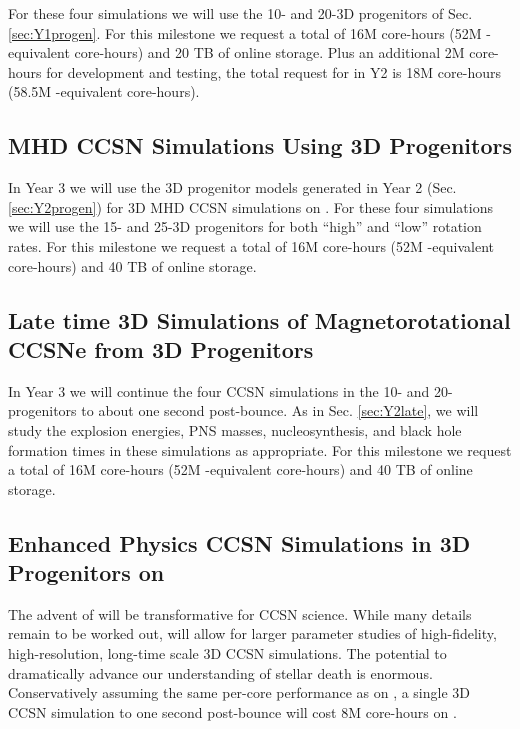 For these four simulations we will use the 10- and 20-\msun 3D progenitors of Sec. \ref{sec:Y1progen}.
For this milestone we request a total of 16M \thet core-hours (52M \mira-equivalent core-hours) and 20 TB of online storage.
Plus an additional 2M \thet core-hours for development and testing, the total request for \thet in Y2 is 18M core-hours (58.5M \mira-equivalent core-hours).

\vspace{0.1in} 

\subsection{MHD CCSN Simulations Using 3D Progenitors}

In Year 3 we will use the 3D progenitor models generated in Year 2 (Sec. \ref{sec:Y2progen}) for 3D MHD CCSN simulations on \thet.
For these four simulations we will use the 15- and 25-\msun 3D progenitors for both ``high'' and ``low'' rotation rates.
For this milestone we request a total of 16M \thet core-hours (52M \mira-equivalent core-hours) and 40 TB of online storage.

\subsection{Late time 3D Simulations of Magnetorotational CCSNe from 3D Progenitors}

In Year 3 we will continue the four CCSN simulations in the 10- and 20-\msun progenitors to about one second post-bounce.
As in Sec. \ref{sec:Y2late}, we will study the explosion energies, PNS masses, nucleosynthesis, and black hole formation times in these simulations as appropriate.
For this milestone we request a total of 16M \thet core-hours (52M \mira-equivalent core-hours) and 40 TB of online storage.


\subsection{Enhanced Physics CCSN Simulations in 3D Progenitors on \aurora}

The advent of \aurora will be transformative for CCSN science.
While many details remain to be worked out, \aurora will allow for larger parameter studies of high-fidelity, high-resolution, long-time scale 3D CCSN simulations.
The potential to dramatically advance our understanding of stellar death is enormous.
Conservatively assuming the same per-core performance as on \thet, a single 3D CCSN simulation to one second post-bounce will cost 8M core-hours on \aurora.

